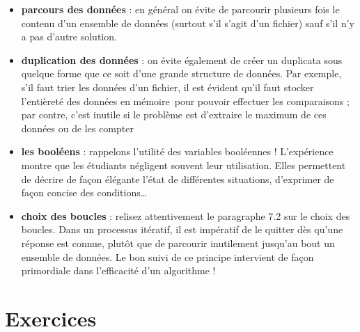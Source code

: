 \liststyleListi
\begin{itemize}
	\item 
		\textbf{parcours des données} : en général on évite de parcourir
		plusieurs fois le contenu d’un ensemble de données (surtout s’il s’agit
		d’un fichier) sauf s’il n’y a pas d’autre solution.
	\item 
		\textbf{duplication des données} : on évite également de créer un
		duplicata sous quelque forme que ce soit d’une grande structure de
		données. Par exemple, s’il faut trier les données d’un fichier, il est
		évident qu’il faut stocker l’entièreté des données en mémoire~pour
		pouvoir effectuer les comparaisons ; par contre, c’est inutile si le
		problème est d’extraire le maximum de ces données ou de les compter
	\item 
		\textbf{les booléens} : rappelons l’utilité des variables booléennes !
		L’expérience montre que les étudiants négligent souvent leur
		utilisation. Elles permettent de décrire de façon élégante l’état de
		différentes situations, d’exprimer de façon concise des conditions…
	\item 
		\textbf{choix des boucles} : relisez attentivement le paragraphe 7.2 sur
		le choix des boucles. Dans un processus itératif, il est impératif de
		le quitter dès qu’une réponse est connue, plutôt que de parcourir
		inutilement jusqu’au bout un ensemble de données. Le bon suivi de ce
		principe intervient de façon primordiale dans l’efficacité d’un
		algorithme ! 
\end{itemize}


\section{Exercices}

